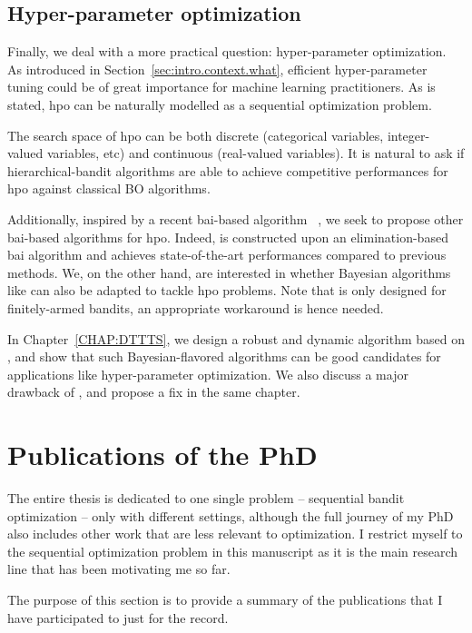 \subsection{Hyper-parameter optimization}\label{sec:intro.mab.hpo}

Finally, we deal with a more practical question: hyper-parameter optimization. As introduced in Section~\ref{sec:intro.context.what}, efficient hyper-parameter tuning could be of great importance for machine learning practitioners. As is stated, \gls{hpo} can be naturally modelled as a sequential optimization problem.

The search space of \gls{hpo} can be both discrete (categorical variables, integer-valued variables, etc) and continuous (real-valued variables). It is natural to ask if hierarchical-bandit algorithms are able to achieve competitive performances for \gls{hpo} against classical BO algorithms.

Additionally, inspired by a recent \gls{bai}-based algorithm \Hyperband~\citep{li2017hyperband}, we seek to propose other \gls{bai}-based algorithms for \gls{hpo}. Indeed, \Hyperband is constructed upon an elimination-based \gls{bai} algorithm and achieves state-of-the-art performances compared to previous methods. We, on the other hand, are interested in whether Bayesian algorithms like \TTTS{} can also be adapted to tackle \gls{hpo} problems. Note that \TTTS{} is only designed for \gls{finitely-armed bandits}, an appropriate workaround is hence needed.

In Chapter~\ref{CHAP:DTTTS}, we design a robust and dynamic algorithm \DTTTS{} based on \TTTS{}, and show that such Bayesian-flavored algorithms can be good candidates for applications like hyper-parameter optimization. We also discuss a major drawback of \DTTTS{}, and propose a fix in the same chapter.

\section{Publications of the PhD}\label{sec:intro.contributions}

The entire thesis is dedicated to one single problem -- sequential bandit optimization -- only with different settings, although the full journey of my PhD also includes other work that are less relevant to optimization. I restrict myself to the sequential optimization problem in this manuscript as it is the main research line that has been motivating me so far.

The purpose of this section is to provide a summary of the publications that I have participated to just for the record.

